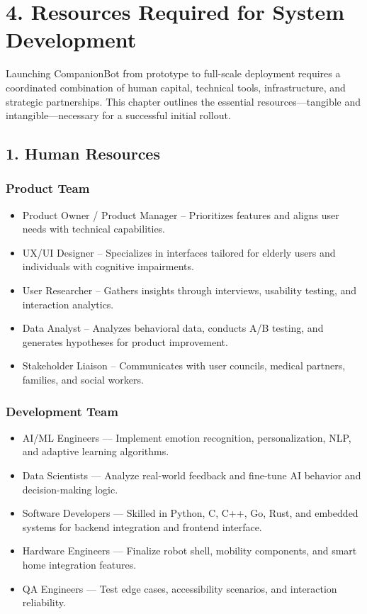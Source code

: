 \documentclass[
  letterpaper,
  DIV=11,
  numbers=noendperiod]{scrartcl}
\providecommand{\tightlist}{%
  \setlength{\itemsep}{0pt}\setlength{\parskip}{0pt}}\usepackage{longtable,booktabs,array}
\begin{document}
\section{4. Resources Required for System
Development}\label{resources-required-for-system-development}

Launching CompanionBot from prototype to full-scale deployment requires
a coordinated combination of human capital, technical tools,
infrastructure, and strategic partnerships. This chapter outlines the
essential resources---tangible and intangible---necessary for a
successful initial rollout.

\subsection{1. Human Resources}\label{human-resources}

\subsubsection{Product Team}\label{product-team}

\begin{itemize}
\tightlist
\item
  Product Owner / Product Manager -- Prioritizes features and aligns
  user needs with technical capabilities.
\item
  UX/UI Designer -- Specializes in interfaces tailored for elderly users
  and individuals with cognitive impairments.
\item
  User Researcher -- Gathers insights through interviews, usability
  testing, and interaction analytics.
\item
  Data Analyst -- Analyzes behavioral data, conducts A/B testing, and
  generates hypotheses for product improvement.
\item
  Stakeholder Liaison -- Communicates with user councils, medical
  partners, families, and social workers.
\end{itemize}

\subsubsection{Development Team}\label{development-team}

\begin{itemize}
\tightlist
\item
  AI/ML Engineers --- Implement emotion recognition, personalization,
  NLP, and adaptive learning algorithms.
\item
  Data Scientists --- Analyze real-world feedback and fine-tune AI
  behavior and decision-making logic.
\item
  Software Developers --- Skilled in Python, C, C++, Go, Rust, and
  embedded systems for backend integration and frontend interface.
\item
  Hardware Engineers --- Finalize robot shell, mobility components, and
  smart home integration features.
\item
  QA Engineers --- Test edge cases, accessibility scenarios, and
  interaction reliability.
\end{itemize}
\end{document}
